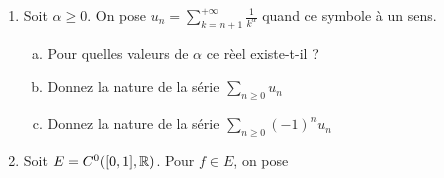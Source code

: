 \begin{enumerate}[1)]
    \item Soit $\alpha \geqslant 0$. On pose $u_n = \sum\limits_{k=n+1}^{+\infty}\frac{1}{k^\alpha}$ quand ce symbole à un sens.
        \begin{enumerate}[a)]
            \item Pour quelles valeurs de $\alpha$ ce rèel existe-t-il ?
            \item Donnez la nature de la série $\sum\limits_{n \geqslant 0} u_n$
            \item Donnez la nature de la série $\sum\limits_{n \geqslant 0}(-1)^n u_n$
        \end{enumerate}
    \item Soit $E = C^0([0,1], \mathbb{R})$. Pour $f \in E$, on pose 
\end{enumerate}